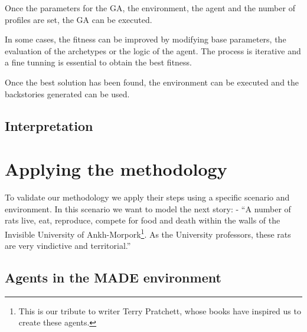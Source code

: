 \documentclass{sig-alternate}
\begin{document}
Once the parameters for the GA, the environment, the agent and the number of profiles are set, the GA can be executed.

In some cases, the fitness can be improved by modifying base parameters, the evaluation of the archetypes or the logic of the agent. The process is iterative and a fine tunning is essential to obtain the best fitness.

Once the best solution has been found, the environment can be executed and the backstories generated can be used.

\subsection{Interpretation}




\section{Applying the methodology}
\label{sec:applying}

To validate our methodology we apply their steps using a specific scenario and environment. In this scenario we want to model the next story: %
 - ``A number of rats live, eat, reproduce, compete for food and death within the walls of the Invisible University of Ankh-Morpork\footnote{This is our tribute to writer Terry Pratchett, whose books have inspired us to create these agents.}. As the University professors, these rats are very vindictive and territorial.''

\subsection{Agents in the MADE environment}
\end{document}
